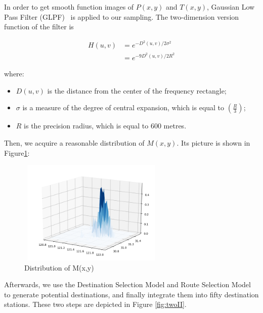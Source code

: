 \documentclass{mcmthesis}
\begin{document}
In order to get smooth function images of $P(x,y)$ and $T(x,y)$, Gaussian Low Pass Filter (GLPF)~\cite{DigitalImageProcessing} is applied to our sampling. The two-dimension version function of the filter is

\begin{equation}
    \begin{split}
      H(u,v)     & =   e^{-D^2(u,v)/2\sigma^2}\\
                 & =   e^{-9D^2(u,v)/2R^2}
    \end{split}
\end{equation}

where:
\begin{itemize}
\item $D(u,v)$ is the distance from the center of the frequency rectangle;
\item $\sigma$ is a measure of the degree of central expansion, which is equal to $\left( \frac{R}{3} \right)$;
\item $R$ is the precision radius, which is equal to 600 metres.
\end{itemize}

Then, we acquire a reasonable distribution of $M(x,y)$. Its picture is shown in Figure\ref{fig:M(x,y)}:

\begin{figure}[htbp]
    \centering
    \includegraphics[height=5cm,width=7cm]{figures/M(x,y).png}
    \caption{Distribution of M(x,y)}
    \label{fig:M(x,y)}
\end{figure}

Afterwards, we use the Destination Selection Model and Route Selection Model to generate potential destinations, and finally integrate them into fifty destination stations. These two steps are depicted in Figure \ref{fig:twoII}.
\end{document}
